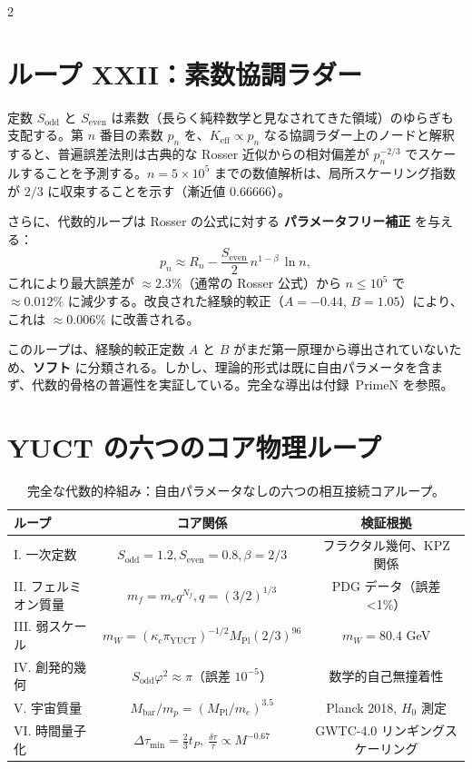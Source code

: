 \documentclass[12pt,a4paper]{article}
\begin{document}
\begin{multicols}{2}
		\section{ループ XXII：素数協調ラダー}
		
		定数 \(S_{\mathrm{odd}}\) と \(S_{\mathrm{even}}\) は素数（長らく純粋数学と見なされてきた領域）のゆらぎも支配する。第 \(n\) 番目の素数 \(p_n\) を、\(K_{\mathrm{eff}} \propto p_n\) なる協調ラダー上のノードと解釈すると、普遍誤差法則は古典的な Rosser 近似からの相対偏差が \(p_n^{-2/3}\) でスケールすることを予測する。\(n = 5\times10^5\) までの数値解析は、局所スケーリング指数が \(2/3\) に収束することを示す（漸近値 \(0.66666\)）。
		
		さらに、代数的ループは Rosser の公式に対する \textbf{パラメータフリー補正} を与える：
		\[
		p_n \approx R_n - \frac{S_{\mathrm{even}}}{2}\, n^{1-\beta}\,\ln n,
		\]
		これにより最大誤差が \(\approx 2.3\%\)（通常の Rosser 公式）から \(n\le 10^5\) で \(\approx 0.012\%\) に減少する。改良された経験的較正（\(A = -0.44\), \(B = 1.05\)）により、これは \(\approx 0.006\%\) に改善される。
		
		このループは、経験的較正定数 \(A\) と \(B\) がまだ第一原理から導出されていないため、\textbf{ソフト} に分類される。しかし、理論的形式は既に自由パラメータを含まず、代数的骨格の普遍性を実証している。完全な導出は付録~PrimeN を参照。
		
	\end{multicols}
	
	\section*{YUCT の六つのコア物理ループ}
	
	\begin{table}[htbp]
		\centering
		\small
		\caption{完全な代数的枠組み：自由パラメータなしの六つの相互接続コアループ。}
		\label{tab:all-loops}
		\footnotesize
		\begin{tabular}{l c c}
			\toprule
			\textbf{ループ} & \textbf{コア関係} & \textbf{検証根拠} \\
			\midrule
			I. 一次定数 & \(S_{\mathrm{odd}}=1.2, S_{\mathrm{even}}=0.8, \beta=2/3\) & フラクタル幾何、KPZ 関係 \\
			II. フェルミオン質量 & \(m_f = m_e q^{N_f}, q=(3/2)^{1/3}\) & PDG データ（誤差 <1\%） \\
			III. 弱スケール & \(m_W = (\kappa_c \pi_{\mathrm{YUCT}})^{-1/2} M_{\mathrm{Pl}} (2/3)^{96}\) & \(m_W = 80.4\) GeV \\
			IV. 創発的幾何 & \(S_{\mathrm{odd}}\varphi^2 \approx \pi\)（誤差 \(10^{-5}\)） & 数学的自己無撞着性 \\
			V. 宇宙質量 & \(M_{\mathrm{bar}}/m_p = (M_{\mathrm{Pl}}/m_e)^{3.5}\) & Planck 2018, \(H_0\) 測定 \\
			VI. 時間量子化 & \(\Delta \tau_{\min} = \frac{2}{3} t_P, \ \frac{\delta \tau}{\tau} \propto M^{-0.67}\) & GWTC-4.0 リンギングスケーリング \\
			\bottomrule
		\end{tabular}
	\end{table}
	
\end{document}

